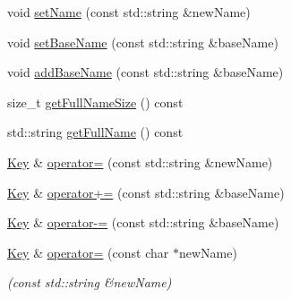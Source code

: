 \begin{DoxyCompactItemize}
\item 
void \hyperlink{classkdb_1_1Key_aac3b5d3a854d02187484bfbdbdf975af}{set\-Name} (const std\-::string \&new\-Name)
\begin{DoxyCompactList}\small\item\em \end{DoxyCompactList}\item 
void \hyperlink{classkdb_1_1Key_a0c8c7cef03d6482d89973be72fb3c8b8}{set\-Base\-Name} (const std\-::string \&base\-Name)
\begin{DoxyCompactList}\small\item\em \end{DoxyCompactList}\item 
void \hyperlink{classkdb_1_1Key_ad2f72ce0985413ce588dc33a575ea306}{add\-Base\-Name} (const std\-::string \&base\-Name)
\begin{DoxyCompactList}\small\item\em \end{DoxyCompactList}\item 
size\-\_\-t \hyperlink{classkdb_1_1Key_ae5fdd8749d3efc2dab198192f1c6e557}{get\-Full\-Name\-Size} () const 
\begin{DoxyCompactList}\small\item\em \end{DoxyCompactList}\item 
std\-::string \hyperlink{classkdb_1_1Key_ab94686ea0b459e5a383942ec322d9c6e}{get\-Full\-Name} () const 
\begin{DoxyCompactList}\small\item\em \end{DoxyCompactList}\item 
\hyperlink{classkdb_1_1Key}{Key} \& \hyperlink{classkdb_1_1Key_a1088953de1f4a02bacbb024886f2bd63}{operator=} (const std\-::string \&new\-Name)
\item 
\hyperlink{classkdb_1_1Key}{Key} \& \hyperlink{classkdb_1_1Key_a1f56973e120ea970daacc526a7e0b56c}{operator+=} (const std\-::string \&base\-Name)
\item 
\hyperlink{classkdb_1_1Key}{Key} \& \hyperlink{classkdb_1_1Key_a81fae5435f131a9a9001f73945ca566f}{operator-\/=} (const std\-::string \&base\-Name)
\item 
\hyperlink{classkdb_1_1Key}{Key} \& \hyperlink{classkdb_1_1Key_a913f9844f07efb50fec5883e50bb9c98}{operator=} (const char $\ast$new\-Name)
\begin{DoxyCompactList}\small\item\em (const std\-::string \&new\-Name) \end{DoxyCompactList}\item 

\end{DoxyCompactItemize}
